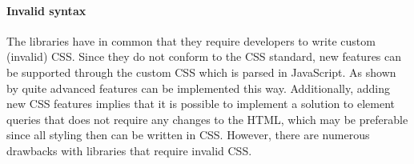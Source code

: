 \documentclass{acm_proc_article-sp}
\newcommand{\gls}[1]{#1}
\begin{document}


  \paragraph{Invalid syntax}
  The libraries \cite{eq_imp_magichtml,eq_imp_eqcss,eq_imp_prollyfill-min-width,eq_imp_localised-css,eq_imp_gss} have in common that they require developers to write custom (invalid) \gls{CSS}.
  Since they do not conform to the \gls{CSS} standard, new features can be supported through the custom \gls{CSS} which is parsed in JavaScript.
  As shown by \cite{eq_imp_eqcss,eq_imp_gss} quite advanced features can be implemented this way.
  Additionally, adding new \gls{CSS} features implies that it is possible to implement a solution to element queries that does not require any changes to the \gls{HTML}, which may be preferable since all styling then can be written in \gls{CSS}.
  However, there are numerous drawbacks with libraries that require invalid \gls{CSS}.
  
\end{document}
